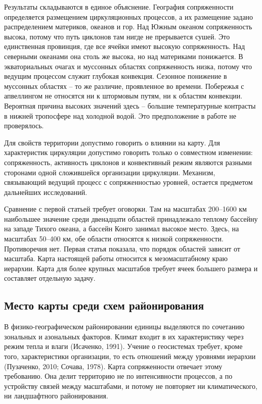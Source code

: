 \documentclass[12pt,a4paper]{article}
\begin{document}
Результаты складываются в единое объяснение. География сопряженности определяется размещением циркуляционных процессов, а их размещение задано распределением материков, океанов и гор. Над Южным океаном сопряженность высока, потому что путь циклонов там нигде не прерывается сушей. Это единственная провинция, где все ячейки имеют высокую сопряженность. Над северными океанами она столь же высока, но над материками понижается. В экваториальных очагах и муссонных областях сопряженность низка, потому что ведущим процессом служит глубокая конвекция. Сезонное понижение в муссонных областях -- то же различие, проявленное во времени. Побережья с апвеллингом не относятся ни к штормовым путям, ни к областям конвекции. Вероятная причина высоких значений здесь -- большие температурные контрасты в нижней тропосфере над холодной водой. Это предположение в работе не проверялось.

Для свойств территории допустимо говорить о влиянии на карту. Для характеристик циркуляции допустимо говорить только о совместном изменении: сопряженность, активность циклонов и конвективный режим являются разными сторонами одной сложившейся организации циркуляции. Механизм, связывающий ведущий процесс с сопряженностью уровней, остается предметом дальнейших исследований.

Сравнение с первой статьей требует оговорки. Там на масштабах 200--1600 км наибольшее значение среди двенадцати областей принадлежало теплому бассейну на западе Тихого океана, а бассейн Конго занимал высокое место. Здесь, на масштабах 50--400 км, обе области относятся к низкой сопряженности. Противоречия нет. Первая статья показала, что порядок областей зависит от масштаба. Карта настоящей работы относится к мезомасштабному краю иерархии. Карта для более крупных масштабов требует ячеек большего размера и составляет отдельную задачу.

\subsection{Место карты среди схем районирования}

В физико-географическом районировании единицы выделяются по сочетанию зональных и азональных факторов. Климат входит в их характеристику через режим тепла и влаги (Исаченко, 1991). Учение о геосистемах требует, кроме того, характеристики организации, то есть отношений между уровнями иерархии (Пузаченко, 2010; Сочава, 1978). Карта сопряженности отвечает этому требованию. Она делит территорию не по интенсивности процессов, а по устройству связей между масштабами, и потому не повторяет ни климатического, ни ландшафтного районирования.
\end{document}
